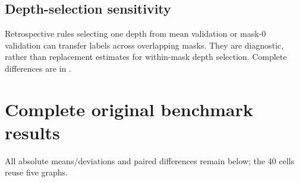 \subsection{Depth-selection sensitivity}\label{app:depth-sensitivity}
Retrospective rules selecting one depth from mean validation or mask-0 validation can transfer labels across overlapping masks. They are diagnostic, rather than replacement estimates for within-mask depth selection. Complete differences are in .

\section{Complete original benchmark results}\label{app:full-results}
All absolute means/deviations and paired differences remain below; the 40 cells reuse five graphs.

